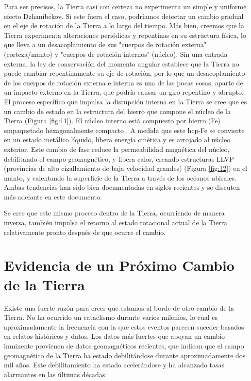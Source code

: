 \documentclass[10pt,twocolumn,letterpaper]{article}
\begin{document}
Para ser precisos, la Tierra casi con certeza no experimenta un simple y uniforme efecto Dzhanibekov. Si este fuera el caso, podríamos detectar un cambio gradual en el eje de rotación de la Tierra a lo largo del tiempo. Más bien, creemos que la Tierra experimenta alteraciones periódicas y repentinas en su estructura física, lo que lleva a un desacoplamiento de sus "cuerpos de rotación externa" (corteza/manto) y "cuerpos de rotación internos" (núcleo). Sin una entrada externa, la ley de conservación del momento angular establece que la Tierra no puede cambiar repentinamente su eje de rotación, por lo que un desacoplamiento de los cuerpos de rotación externa e interna es una de las pocas cosas, aparte de un impacto externo en la Tierra, que podría causar un giro repentino y abrupto.
El proceso específico que impulsa la disrupción interna en la Tierra se cree que es un cambio de estado en la estructura del hierro que compone el núcleo de la Tierra (Figura \ref{fig:11}). El núcleo interno está compuesto por hierro (Fe) empaquetado hexagonalmente compacto \cite{141}. A medida que este hcp-Fe se convierte en un estado metálico líquido, libera energía cinética y es arrojado al núcleo exterior. Este cambio de fase reduce la permeabilidad magnética del núcleo, debilitando el campo geomagnético, y libera calor, creando estructuras LLVP (provincias de alto cizallamiento de baja velocidad grandes) (Figura \ref{fig:12}) \cite{38} en el manto, y calentando la superficie de la Tierra a través de los océanos abisales. Ambas tendencias han sido bien documentadas en siglos recientes y se discuten más adelante en este documento.

Se cree que este mismo proceso dentro de la Tierra, ocurriendo de manera inversa, también impulsa el retorno al estado rotacional actual de la Tierra relativamente pronto después de que ocurre el cambio.

\section{Evidencia de un Próximo Cambio de la Tierra}

Existe una fuerte razón para creer que estamos al borde de otro cambio de la Tierra. No ha ocurrido un cataclismo durante varios milenios, lo cual es aproximadamente la frecuencia con la que estos eventos parecen suceder basados en relatos históricos y datos. Los datos más fuertes que apoyan un cambio inminente provienen de datos geomagnéticos recientes, que indican que el campo geomagnético de la Tierra ha estado debilitándose durante aproximadamente dos mil años. Este debilitamiento ha estado acelerándose y ha alcanzado tasas alarmantes en las últimas décadas.
\end{document}
